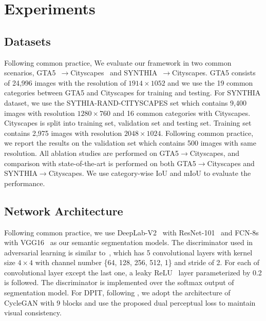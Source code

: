 \documentclass[10pt,twocolumn,letterpaper]{article}
\begin{document}
\section{Experiments}
\label{section:exp}
\subsection{Datasets}
Following common practice, We evaluate our framework in two common scenarios, GTA5~\cite{richter2016playing}$\rightarrow$Cityscapes~\cite{cordts2016cityscapes} and SYNTHIA~\cite{ros2016synthia}$\rightarrow$Cityscapes. GTA5 consists of 24,996 images with the resolution of $1914\times1052$ and we use the 19 common categories between GTA5 and Cityscapes for training and testing. For SYNTHIA dataset, we use the SYTHIA-RAND-CITYSCAPES set which contains 9,400 images with resolution $1280\times760$ and 16 common categories with Cityscapes. Cityscapes is split into training set, validation set and testing set. Training set contains 2,975 images with resolution $2048\times1024$. Following common practice, we report the results on the validation set which contains 500 images with same resolution. All ablation studies are performed on GTA5$\rightarrow$Cityscapes, and comparison with state-of-the-art is performed on both GTA5$\rightarrow$Cityscapes and SYNTHIA$\rightarrow$Cityscapes. We use category-wise IoU and mIoU to evaluate the performance.


\subsection{Network Architecture}

Following common practice, we use DeepLab-V2~\cite{chen2018deeplab} with ResNet-101~\cite{he2016deep} and FCN-8s~\cite{long2015fully} with VGG16~\cite{simonyan2014very} as our semantic segmentation models. The discriminator used in adversarial learning is similar to~\cite{radford2015unsupervised}, which has 5 convolutional layers with kernel size $4 \times 4$ with channel number \{64, 128, 256, 512, 1\} and stride of 2. For each of convolutional layer except the last one, a leaky ReLU~\cite{xu2015empirical} layer parameterized by 0.2 is followed. The discriminator is implemented over the softmax output of segmentation model. For DPIT, following \cite{li2019bidirectional}, we adopt the architecture of CycleGAN with 9 blocks and use the proposed dual perceptual loss to maintain visual consistency. 
\end{document}
